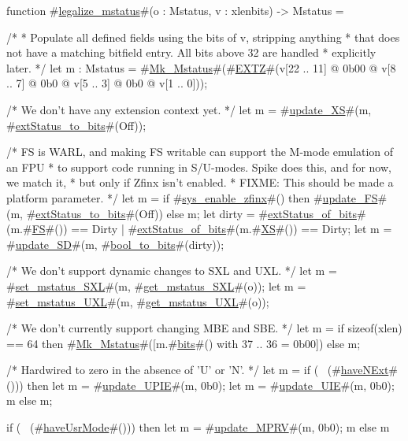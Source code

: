 function #\hyperref[sailRISCVzlegalizzezymstatus]{legalize\_mstatus}#(o : Mstatus, v : xlenbits) -> Mstatus = {
  /*
   * Populate all defined fields using the bits of v, stripping anything
   * that does not have a matching bitfield entry. All bits above 32 are handled
   * explicitly later.
   */
  let m : Mstatus = #\hyperref[sailRISCVzMkzyMstatus]{Mk\_Mstatus}#(#\hyperref[sailRISCVzEXTZ]{EXTZ}#(v[22 .. 11] @ 0b00 @ v[8 .. 7] @ 0b0 @ v[5 .. 3] @ 0b0 @ v[1 .. 0]));

  /* We don't have any extension context yet. */
  let m = #\hyperref[sailRISCVzupdatezyXS]{update\_XS}#(m, #\hyperref[sailRISCVzextStatuszytozybits]{extStatus\_to\_bits}#(Off));

  /* FS is WARL, and making FS writable can support the M-mode emulation of an FPU
   * to support code running in S/U-modes.  Spike does this, and for now, we match it,
   * but only if Zfinx isn't enabled.
   * FIXME: This should be made a platform parameter.
   */
  let m = if #\hyperref[sailRISCVzsyszyenablezyzzfinx]{sys\_enable\_zfinx}#() then #\hyperref[sailRISCVzupdatezyFS]{update\_FS}#(m, #\hyperref[sailRISCVzextStatuszytozybits]{extStatus\_to\_bits}#(Off)) else m;
  let dirty = #\hyperref[sailRISCVzextStatuszyofzybits]{extStatus\_of\_bits}#(m.#\hyperref[sailRISCVzFS]{FS}#()) == Dirty | #\hyperref[sailRISCVzextStatuszyofzybits]{extStatus\_of\_bits}#(m.#\hyperref[sailRISCVzXS]{XS}#()) == Dirty;
  let m = #\hyperref[sailRISCVzupdatezySD]{update\_SD}#(m, #\hyperref[sailRISCVzboolzytozybits]{bool\_to\_bits}#(dirty));

  /* We don't support dynamic changes to SXL and UXL. */
  let m = #\hyperref[sailRISCVzsetzymstatuszySXL]{set\_mstatus\_SXL}#(m, #\hyperref[sailRISCVzgetzymstatuszySXL]{get\_mstatus\_SXL}#(o));
  let m = #\hyperref[sailRISCVzsetzymstatuszyUXL]{set\_mstatus\_UXL}#(m, #\hyperref[sailRISCVzgetzymstatuszyUXL]{get\_mstatus\_UXL}#(o));

  /* We don't currently support changing MBE and SBE. */
  let m = if sizeof(xlen) == 64 then {
             #\hyperref[sailRISCVzMkzyMstatus]{Mk\_Mstatus}#([m.#\hyperref[sailRISCVzbits]{bits}#() with 37 .. 36 = 0b00])
          } else m;

  /* Hardwired to zero in the absence of 'U' or 'N'. */
  let m = if (~ (#\hyperref[sailRISCVzhaveNExt]{haveNExt}#())) then {
             let m = #\hyperref[sailRISCVzupdatezyUPIE]{update\_UPIE}#(m, 0b0);
             let m = #\hyperref[sailRISCVzupdatezyUIE]{update\_UIE}#(m, 0b0);
             m
          } else m;

  if (~ (#\hyperref[sailRISCVzhaveUsrMode]{haveUsrMode}#())) then {
    let m = #\hyperref[sailRISCVzupdatezyMPRV]{update\_MPRV}#(m, 0b0);
    m
  } else m
}
